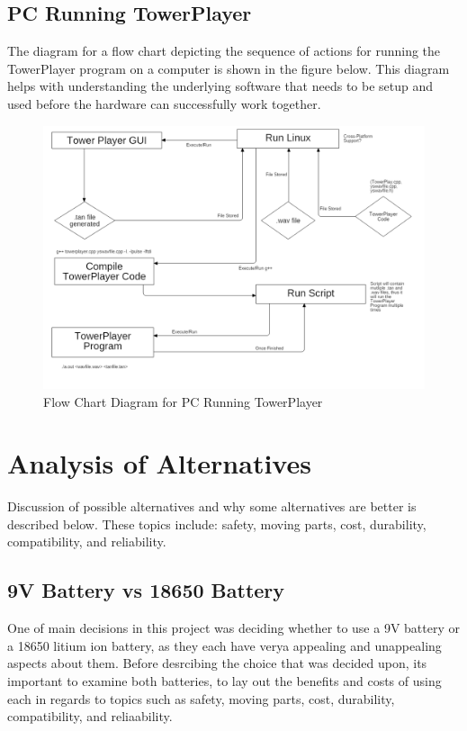 \documentclass[12pt]{article}
\begin{document}
{{{{{	\subsection{PC Running TowerPlayer}
	The diagram for a flow chart depicting the sequence of actions for running the TowerPlayer program on a computer is shown in the figure below. This diagram helps with understanding the underlying software that needs to be setup and used before the hardware can successfully work together.
	
		\begin{figure}[ht!]
			\centering
			\includegraphics[width=170mm]{assets/PCRunningTowerPlayerFlowChartDiagram.png}
			\caption{Flow Chart Diagram for PC Running TowerPlayer \label{overflow}}
		\end{figure}

	\clearpage

\section{Analysis of Alternatives}
	Discussion of possible alternatives and why some alternatives are better is described below. These topics include: safety, moving parts, cost, durability, compatibility, and reliability.
	
	\subsection{9V Battery vs 18650 Battery}
	One of main decisions in this project was deciding whether to use a 9V battery or a 18650 litium ion battery, as they each have verya appealing and unappealing aspects about them. Before desrcibing the choice that was decided upon, its important to examine both batteries, to lay out the benefits and costs of using each in regards to topics such as safety, moving parts, cost, durability, compatibility, and reliaability.\\
	
}}}}}
\end{document}

